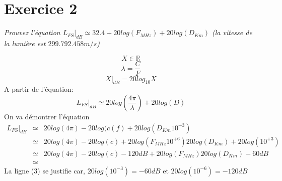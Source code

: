 \documentclass[a4paper,11pt,onecolumn]{article}
\begin{document}
\section{Exercice 2}
\textit{Prouvez l'équation $L_{FS}|_{dB} \simeq 32.4 + 20 log(F_{MHz}) + 20 log(D_{Km})$ (la vitesse de la lumière est $299.792.458 m/s$)}
\begin{framed}
	$$X \in \mathbb{R}$$
	$$\lambda = \frac{C}{F}$$
	$$X|_{dB} = 20 log_{10}X$$
	A partir de l'équation:
	$$L_{FS}|_{dB} \simeq 20 log(\frac{4\pi}{\lambda}) + 20 log(D)$$
	On va démontrer l'équation
	\begin{eqnarray}
		L_{FS}|_{dB} &\simeq& 20 log(4\pi) - 20 log(c(f) + 20 log(D_{Km} 10^{+3}) \\
		 &\simeq& 20 log(4\pi) - 20 log(c) + 20 log(F_{MHz}10^{+6}) 20 log(D_{Km}) + 20 log(10^{+3})\\
		 &\simeq& 20 log(4\pi) - 20 log(c) -120dB + 20 log(F_{MHz}) 20 log(D_{Km}) -60dB\\
		 &\simeq&
	\end{eqnarray}
	La ligne (3) se justifie car, $20 log(10^{-3}) = -60dB$ et  $20 log(10^{-6}) = -120dB$
\end{framed}
\end{document}
